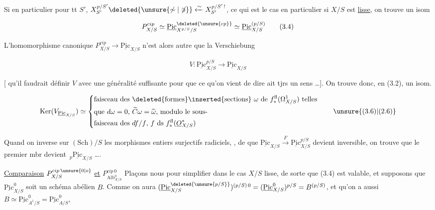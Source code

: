 
Si en particulier pour tt $S'$, $X_{S'}^{p/S'}\deleted{\unsure{\not\sim|\not\ni}}\xleftarrow{\sim} X_{S'}^{p/S'\,!}$, ce qui est le cas en particulier si $X/S$ est \uline{lisse}, on trouve un isom

\[
P^{cip}_{X/S}\simeq \underline{\mathrm{Pic}}^{\deleted{\unsure{cp}}}_{X^{p/S}/S}\simeq\underline{\mathrm{Pic}}_{X/S}^{(p/S)}\tag*{(3.4)}
\]

L'homomorphisme canonique $P^{cip}_{X/S}\to\underline{\mathrm{Pic}}_{X/S}$ n'est alors autre que la Verschiebung

\[
V\colon\underline{\mathrm{Pic}}_{X/S}^{p/S}\longrightarrow\underline{\mathrm{Pic}}_{X/S}\tag*{(3.5)}
\]

[ qu'il faudrait définir $V$ avec une généralité suffisante pour que ce qu'on vient de dire ait tjrs un sens \ldots]. On trouve donc, en   (3.2), un isom.

\[
\mathrm{Ker}(V_{\underline{\mathrm{Pic}}_{X/S}})\simeq
\left\{\begin{aligned}
&\text{faisceau des \deleted{formes}\inserted{sections} $\omega$ de $f_*^{\mathrm{fl}}(\Omega^1_{X/S})$ telles}\\
&\text{que $d\omega=0$, $\widetilde C\omega=\widetilde\omega$, modulo le sous-}\\
&\text{faisceau des $df/f$, $f$ ds $f_*^{\mathrm{fl}}(\underline O^*_{X/S})$}
\end{aligned}\right.\tag*{\unsure{(3.6)|(2.6)}}
\]

Quand on inverse sur $(\mathrm{Sch})/S$ les  morphismes entiers surjectifs radiciels, , de  que $\underline{\mathrm{Pic}}_{X/S}\xrightarrow F\underline{\mathrm{Pic}}_{X/S}^{p/S}$ devient inversible, on trouve que le  premier mbr devient $\,{}_p\underline{\mathrm{Pic}}_{X/S}$ \ldots.

\uline{Comparaison}  $P^{cip\,\unsure{0|o}}_{X/S}$ \uline{et} $P^{cip\,0}_{\mathrm{Alb}^0_{X/S}}$ Plaçons nous pour simplifier dans le cas $X/S$ lisse, de sorte que (3.4) est valable, et supposons que $\underline{\mathrm{Pic}}^0_{X/S}$ soit un schéma abélien $B$. Comme on aura $(\underline{\mathrm{Pic}}^{\deleted{\unsure{p/S}}}_{X/S})^{(p/S)\,0}=(\underline{\mathrm{Pic}}^0_{X/S})^{p/S}=B^{(p/S)}$,   et qu'on a aussi $B\simeq\underline{\mathrm{Pic}}^0_{A^1/S}=\underline{\mathrm{Pic}}^0_{A/S}$,

